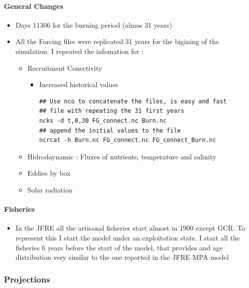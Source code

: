 \documentclass[11pt]{article}
\begin{document}
\paragraph*{General Changes}
\label{sec-6-1-1}

\begin{itemize}
\item Days 11306 for the burning period (almos 31 years)
\item All the Forcing files were replicated 31 years for the bigining of the
  simulation.  I repeated the infomation for :
\begin{itemize}
\item Recruitment Conectivity
\begin{itemize}
\item Increased historical values

\begin{verbatim}
## Use nco to concatenate the files, is easy and fast
## file with repeating the 31 first years
ncks -d t,0,30 FG_connect.nc Burn.nc
## append the initial values to the file
ncrcat -h Burn.nc FG_connect.nc FG_connect_Burn.nc
\end{verbatim}
\end{itemize}
\item Hidrodaynamic : Fluxes of nutrients, temperature and salinity
\item Eddies by box
\item Solar radiation
\end{itemize}
\end{itemize}
\paragraph*{Fisheries}
\label{sec-6-1-2}

\begin{itemize}
\item In the JFRE all the artisanal fisheries start almost in 1900 except GCR. To
   represent this I start the model under an exploitation state. I start all the
   fisheries 6 years before the start of the model,  that provides and age
   distribution very similar to the one reported in the JFRE MPA model
\end{itemize}
\subsubsection*{Projections}
\label{sec-6-2}
\end{document}
